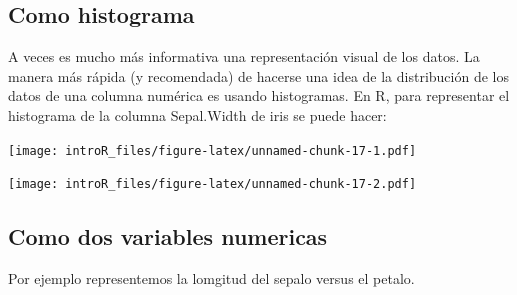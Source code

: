 \documentclass[
]{book}
\newenvironment{Shaded}{\begin{snugshade}}{\end{snugshade}}
\newcommand{\CommentTok}[1]{\textcolor[rgb]{0.56,0.35,0.01}{\textit{#1}}}
\newcommand{\DataTypeTok}[1]{\textcolor[rgb]{0.13,0.29,0.53}{#1}}
\newcommand{\KeywordTok}[1]{\textcolor[rgb]{0.13,0.29,0.53}{\textbf{#1}}}
\newcommand{\NormalTok}[1]{#1}
\newcommand{\OperatorTok}[1]{\textcolor[rgb]{0.81,0.36,0.00}{\textbf{#1}}}
\newcommand{\StringTok}[1]{\textcolor[rgb]{0.31,0.60,0.02}{#1}}
\begin{document}
\hypertarget{como-histograma}{%
\subsection{Como histograma}\label{como-histograma}}

A veces es mucho más informativa una representación visual de los datos. La manera más rápida (y recomendada) de hacerse una idea de la distribución de los datos de una columna numérica es usando histogramas. En R, para representar el histograma de la columna Sepal.Width de iris se puede hacer:

\begin{Shaded}
\end{Shaded}

\texttt{[image: introR\_files/figure-latex/unnamed-chunk-17-1.pdf]}

\begin{Shaded}
\end{Shaded}

\texttt{[image: introR\_files/figure-latex/unnamed-chunk-17-2.pdf]}

\hypertarget{como-dos-variables-numericas}{%
\subsection{Como dos variables numericas}\label{como-dos-variables-numericas}}

Por ejemplo representemos la lomgitud del sepalo versus el petalo.

\begin{Shaded}
\end{Shaded}
\end{document}
